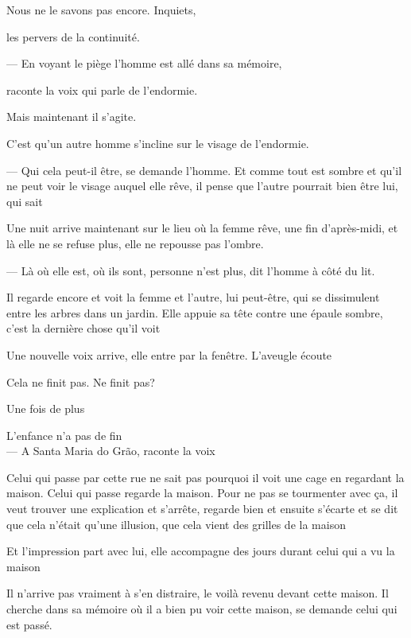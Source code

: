 Nous ne le savons pas encore. Inquiets,

les pervers de la continuité.

\breakk

\vspace*{4cm}

--- En voyant le piège l'homme est allé dans sa mémoire,

raconte la voix qui parle de l'endormie.

Mais maintenant il s'agite.

C'est qu'un autre homme s'incline sur le visage de l'endormie.

--- Qui cela peut-il être, se demande l'homme. Et comme tout est sombre et
qu'il ne peut voir le visage auquel elle rêve, il pense que l'autre
pourrait bien être lui, qui sait

Une nuit arrive maintenant sur le lieu où la femme rêve, une fin
d'après-midi, et là elle ne se refuse plus, elle ne repousse pas
l'ombre.

--- Là où elle est, où ils sont, personne n'est plus, dit l'homme à côté
du lit.

Il regarde encore et voit la femme et l'autre, lui peut-être, qui se
dissimulent entre les arbres dans un jardin. Elle appuie sa tête contre
une épaule sombre, c'est la dernière chose qu'il voit

\breakk

\vspace*{4cm}

Une nouvelle voix arrive, elle entre par la fenêtre. L'aveugle écoute

Cela ne finit pas. Ne finit pas?

Une fois de plus

L'enfance n'a pas de fin\\

--- A Santa Maria do Grão, raconte la voix

Celui qui passe par cette rue ne sait pas pourquoi il voit une cage en
regardant la maison. Celui qui passe regarde la maison. Pour ne pas se
tourmenter avec ça, il veut trouver une explication et s'arrête, regarde
bien et ensuite s'écarte et se dit que cela n'était qu'une illusion, que
cela vient des grilles de la maison

Et l'impression part avec lui, elle accompagne des jours durant celui
qui a vu la maison

Il n'arrive pas vraiment à s'en distraire, le voilà revenu devant cette
maison. Il cherche dans sa mémoire où il a bien pu voir cette maison, se
demande celui qui est passé.

